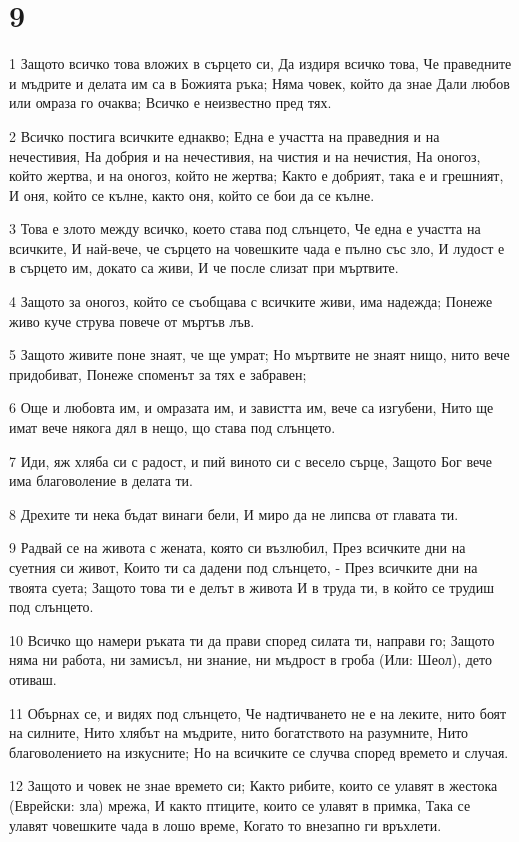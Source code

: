 \chapter{9}

\par 1 Защото всичко това вложих в сърцето си, Да издиря всичко това, Че праведните и мъдрите и делата им са в Божията ръка; Няма човек, който да знае Дали любов или омраза го очаква; Всичко е неизвестно пред тях.
\par 2 Всичко постига всичките еднакво; Една е участта на праведния и на нечестивия, На добрия и на нечестивия, на чистия и на нечистия, На оногоз, който жертва, и на оногоз, който не жертва; Както е добрият, така е и  грешният, И оня, който се кълне, както оня, който се бои да се кълне.
\par 3 Това е злото между всичко, което става под слънцето, Че една е участта на всичките, И най-вече, че сърцето на човешките чада е пълно със зло, И лудост е в сърцето им, докато са живи, И че после слизат при мъртвите.
\par 4 Защото за оногоз, който се съобщава с всичките живи, има надежда; Понеже живо куче струва повече от мъртъв лъв.
\par 5 Защото живите поне знаят, че ще умрат; Но мъртвите не знаят нищо, нито вече придобиват, Понеже споменът за тях е забравен;
\par 6 Още и любовта им, и омразата им, и завистта им, вече са изгубени, Нито ще имат вече някога дял в нещо, що става под слънцето.
\par 7 Иди, яж хляба си с радост, и пий виното си с весело сърце, Защото Бог вече има благоволение в делата ти.
\par 8 Дрехите ти нека бъдат винаги бели, И миро да не липсва от главата ти.
\par 9 Радвай се на живота с жената, която си възлюбил, През всичките дни на суетния си живот, Които ти са дадени под слънцето, - През всичките дни на твоята суета; Защото това ти е делът в живота И в труда ти, в който се трудиш под слънцето.
\par 10 Всичко що намери ръката ти да прави според силата ти, направи го; Защото няма ни работа, ни замисъл, ни знание, ни мъдрост в гроба (Или: Шеол), дето отиваш.
\par 11 Обърнах се, и видях под слънцето, Че надтичването не е на леките, нито боят на силните, Нито хлябът на мъдрите, нито богатството на разумните, Нито благоволението на изкусните; Но на всичките се случва според времето и случая.
\par 12 Защото и човек не знае времето си; Както рибите, които се улавят в жестока (Еврейски: зла) мрежа, И както птиците, които се улавят в примка, Така се улавят човешките чада в лошо време, Когато то внезапно ги връхлети.
